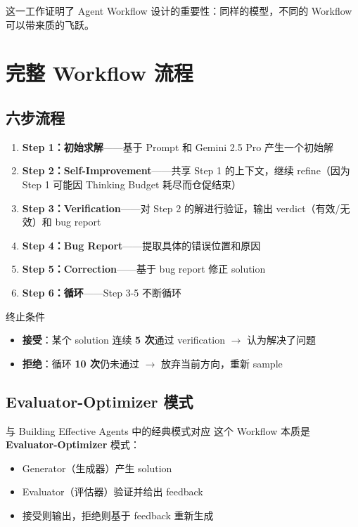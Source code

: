 \documentclass[a4paper]{article}
\begin{document}
这一工作证明了 Agent Workflow 设计的重要性：同样的模型，不同的 Workflow 可以带来质的飞跃。

\section{完整 Workflow 流程}

\subsection{六步流程}

\begin{enumerate}
    \item \textbf{Step 1：初始求解}——基于 Prompt 和 Gemini 2.5 Pro 产生一个初始解
    \item \textbf{Step 2：Self-Improvement}——共享 Step 1 的上下文，继续 refine（因为 Step 1 可能因 Thinking Budget 耗尽而仓促结束）
    \item \textbf{Step 3：Verification}——对 Step 2 的解进行验证，输出 verdict（有效/无效）和 bug report
    \item \textbf{Step 4：Bug Report}——提取具体的错误位置和原因
    \item \textbf{Step 5：Correction}——基于 bug report 修正 solution
    \item \textbf{Step 6：循环}——Step 3-5 不断循环
\end{enumerate}

\begin{importantbox}{终止条件}
\begin{itemize}
    \item \textbf{接受}：某个 solution 连续 \textbf{5 次}通过 verification $\rightarrow$ 认为解决了问题
    \item \textbf{拒绝}：循环 \textbf{10 次}仍未通过 $\rightarrow$ 放弃当前方向，重新 sample
\end{itemize}
\end{importantbox}

\subsection{Evaluator-Optimizer 模式}

\begin{knowledgebox}{与 Building Effective Agents 中的经典模式对应}
这个 Workflow 本质是 \textbf{Evaluator-Optimizer} 模式：
\begin{itemize}
    \item Generator（生成器）产生 solution
    \item Evaluator（评估器）验证并给出 feedback
    \item 接受则输出，拒绝则基于 feedback 重新生成
\end{itemize}
\end{knowledgebox}
\end{document}
